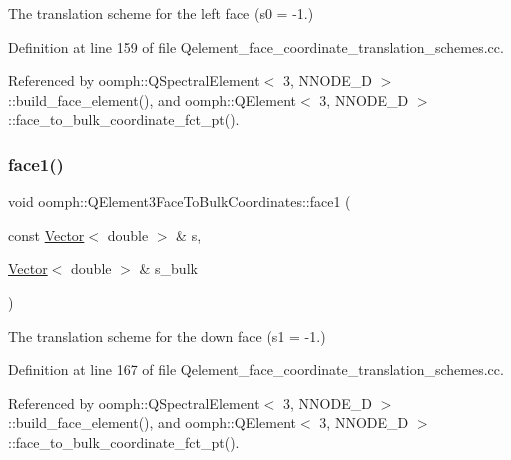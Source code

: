 The translation scheme for the left face (s0 = -\/1.) 



Definition at line 159 of file Qelement\+\_\+face\+\_\+coordinate\+\_\+translation\+\_\+schemes.\+cc.



Referenced by oomph\+::\+Q\+Spectral\+Element$<$ 3, N\+N\+O\+D\+E\+\_\+D $>$\+::build\+\_\+face\+\_\+element(), and oomph\+::\+Q\+Element$<$ 3, N\+N\+O\+D\+E\+\_\+D $>$\+::face\+\_\+to\+\_\+bulk\+\_\+coordinate\+\_\+fct\+\_\+pt().

\mbox{\label{namespaceoomph_1_1QElement3FaceToBulkCoordinates_a1d59d5d45707d18a3317634a4b29c3a5}} 
\subsubsection{\texorpdfstring{face1()}{face1()}}
{\footnotesize\ttfamily void oomph\+::\+Q\+Element3\+Face\+To\+Bulk\+Coordinates\+::face1 (\begin{DoxyParamCaption}\item[{const \hyperlink{classoomph_1_1Vector}{Vector}$<$ double $>$ \&}]{s,  }\item[{\hyperlink{classoomph_1_1Vector}{Vector}$<$ double $>$ \&}]{s\+\_\+bulk }\end{DoxyParamCaption})}



The translation scheme for the down face (s1 = -\/1.) 



Definition at line 167 of file Qelement\+\_\+face\+\_\+coordinate\+\_\+translation\+\_\+schemes.\+cc.



Referenced by oomph\+::\+Q\+Spectral\+Element$<$ 3, N\+N\+O\+D\+E\+\_\+D $>$\+::build\+\_\+face\+\_\+element(), and oomph\+::\+Q\+Element$<$ 3, N\+N\+O\+D\+E\+\_\+D $>$\+::face\+\_\+to\+\_\+bulk\+\_\+coordinate\+\_\+fct\+\_\+pt().

\mbox{\label{namespaceoomph_1_1QElement3FaceToBulkCoordinates_a55c787680b0d4526ecbba1f7f8c5b05b}} 
